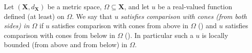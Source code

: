 \begin{definition}
Let $(\mathbf X, d_{\mathbf X})$ be a metric space, $\Omega\subseteq\mathbf X$, and let $u$ be a real-valued function defined (at least) on $\Omega$. We say that $u$ \emph{satisfies comparison with cones (from both sides) in $\Omega$} if $u$ satisfies comparison with cones from above in $\Omega$ () and $u$ satisfies comparison with cones from below in $\Omega$ (). In particular such a $u$ is locally bounded (from above and from below) in $\Omega$.
\end{definition}
